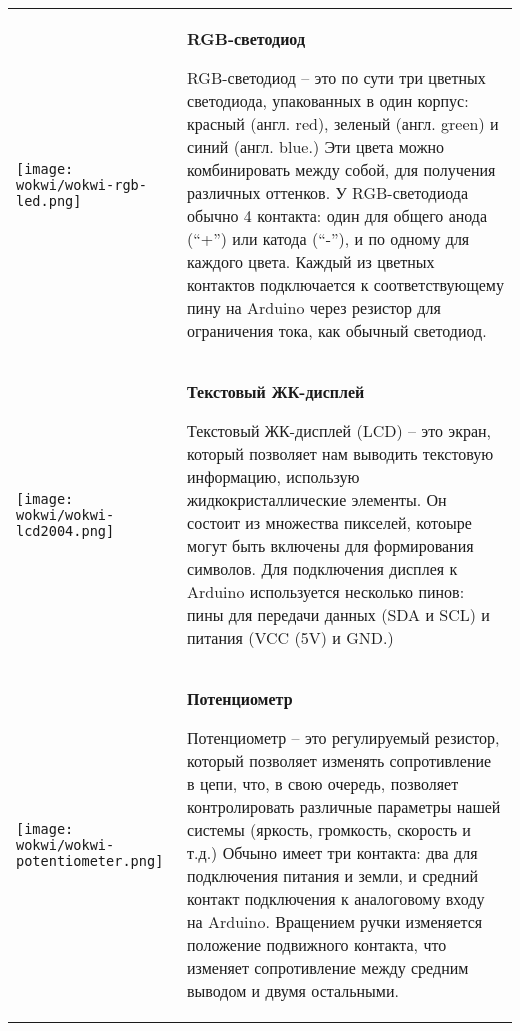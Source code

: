 \documentclass[../sparc.tex]{subfiles}
\begin{document}
\begin{longtable}{|>{
      \centering\arraybackslash
    }p{3cm}|>{
      \centering\arraybackslash}p{8cm}|
  }
{} \\  \hline

\parbox[t][3,6cm][c]{2cm}{\centering \vspace{1cm}
  \texttt{[image: wokwi/wokwi-rgb-led.png]}} &
\parbox[t][5.1cm][t]{8cm}{\centering \textbf{RGB-светодиод}\\ \raggedright

  RGB-светодиод -- это по сути три цветных светодиода, упакованных в один корпус:
  красный (англ. red), зеленый (англ. green) и синий (англ. blue.)  Эти цвета
  можно комбинировать между собой, для получения различных оттенков.  У
  RGB-светодиода обычно 4 контакта: один для общего анода (``+'') или катода
  (``-''), и по одному для каждого цвета.  Каждый из цветных контактов
  подключается к соответствующему пину на Arduino через резистор для ограничения
  тока, как обычный светодиод.

} \\  \hline

\parbox[t][2,8cm][c]{2cm}{\centering \vspace{1cm}
  \texttt{[image: wokwi/wokwi-lcd2004.png]}} &
\parbox[t][4.3cm][t]{8cm}{\centering \textbf{Текстовый ЖК-дисплей}\\ \raggedright

  Текстовый ЖК-дисплей (LCD) -- это экран, который позволяет нам выводить
  текстовую информацию, использую жидкокристаллические элементы.  Он состоит из
  множества пикселей, котоыре могут быть включены для формирования символов.
  Для подключения дисплея к Arduino используется несколько пинов: пины для
  передачи данных (SDA и SCL) и питания (VCC (5V) и GND.)

} \\  \hline

\parbox[t][2,5cm][c]{2cm}{\centering \vspace{1cm}
  \texttt{[image: wokwi/wokwi-potentiometer.png]}} &
\parbox[t][4.6cm][t]{8cm}{\centering \textbf{Потенциометр}\\ \raggedright

  Потенциометр -- это регулируемый резистор, который позволяет изменять
  сопротивление в цепи, что, в свою очередь, позволяет контролировать различные
  параметры нашей системы (яркость, громкость, скорость и т.д.)  Обчыно имеет
  три контакта: два для подключения питания и земли, и средний контакт
  подключения к аналоговому входу на Arduino.  Вращением ручки изменяется
  положение подвижного контакта, что изменяет сопротивление между средним
  выводом и двумя остальными.

}
\end{longtable}
\end{document}
